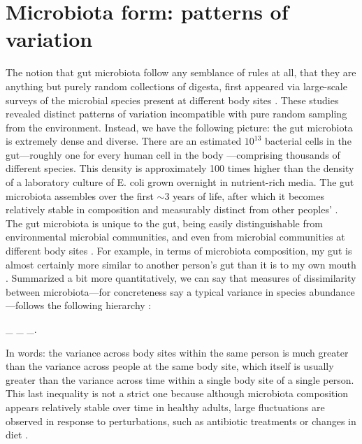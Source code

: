 \section{Microbiota form: patterns of variation}

The notion that gut microbiota follow any semblance of rules at all, that they are anything but purely random collections of digesta, first appeared via large-scale surveys of the microbial species present at different body sites \cite{the_human_microbiome_project_consortium_framework_2012}. These studies revealed distinct patterns of variation incompatible with pure random sampling from the environment. Instead, we have the following picture: the gut microbiota is extremely dense and diverse. There are an estimated $10^{13}$ bacterial cells in the gut---roughly one for every human cell in the body \cite{sender2016revised}---comprising thousands of different species. This density is approximately 100 times higher than the density of a laboratory culture of E. coli grown overnight in nutrient-rich media. The gut microbiota assembles over the first $\sim$3 years of life, after which it becomes relatively stable in composition and measurably distinct from other peoples' \cite{the_human_microbiome_project_consortium_framework_2012,yassour_natural_2016}. The gut microbiota is unique to the gut, being easily distinguishable from environmental microbial communities, and even from microbial communities at different body sites \cite{the_human_microbiome_project_consortium_framework_2012}. For example, in terms of microbiota composition, my gut is almost certainly more similar to another person's gut than it is to my own mouth \cite{the_human_microbiome_project_consortium_framework_2012}. Summarized a bit more quantitatively, we can say that measures of dissimilarity between microbiota---for concreteness say a typical variance in species abundance---follows the following hierarchy \cite{fisher2017variable}:

\be
\Var_{} \gg \Var_{} \gtrsim \Var_{}.
\ee


In words: the variance across body sites within the same person is much greater than the variance across people at the same body site, which itself is usually greater than the variance across time within a single body site of a single person. This last inequality is not a strict one because although microbiota composition appears relatively stable over time in healthy adults, large fluctuations are observed in response to perturbations, such as antibiotic treatments or changes in diet \cite{dethlefsen2011incomplete,david_diet_2014,schlomann2019timescales}.

